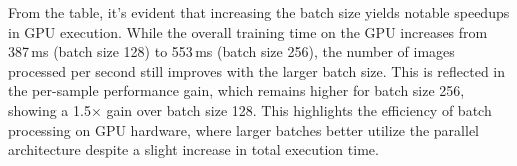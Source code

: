 From the table, it's evident that increasing the batch size yields notable speedups in GPU execution. While the overall training time on the GPU increases from 387 ms (batch size 128) to 553 ms (batch size 256), the number of images processed per second still improves with the larger batch size. This is reflected in the per-sample performance gain, which remains higher for batch size 256, showing a 1.5× gain over batch size 128. This highlights the efficiency of batch processing on GPU hardware, where larger batches better utilize the parallel architecture despite a slight increase in total execution time.


